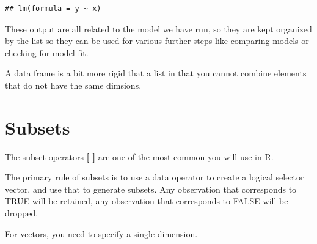 \documentclass[]{book}
\newenvironment{Shaded}{\begin{snugshade}}{\end{snugshade}}
\newcommand{\CommentTok}[1]{\textcolor[rgb]{0.56,0.35,0.01}{\textit{#1}}}
\newcommand{\FloatTok}[1]{\textcolor[rgb]{0.00,0.00,0.81}{#1}}
\newcommand{\NormalTok}[1]{#1}
\newcommand{\OperatorTok}[1]{\textcolor[rgb]{0.81,0.36,0.00}{\textbf{#1}}}
\theoremstyle{definition}
\theoremstyle{definition}
\theoremstyle{definition}
\theoremstyle{remark}
\begin{document}
\begin{Shaded}
\end{Shaded}

\begin{verbatim}
## lm(formula = y ~ x)
\end{verbatim}

These output are all related to the model we have run, so they are kept
organized by the list so they can be used for various further steps like
comparing models or checking for model fit.

A data frame is a bit more rigid that a list in that you cannot combine
elements that do not have the same dimsions.

\begin{Shaded}
\end{Shaded}

\hypertarget{subsets}{%
\section{Subsets}\label{subsets}}

The subset operators \textbf{{[} {]}} are one of the most common you
will use in R.

The primary rule of subsets is to use a data operator to create a
logical selector vector, and use that to generate subsets. Any
observation that corresponds to TRUE will be retained, any observation
that corresponds to FALSE will be dropped.

For vectors, you need to specify a single dimension.
\end{document}
